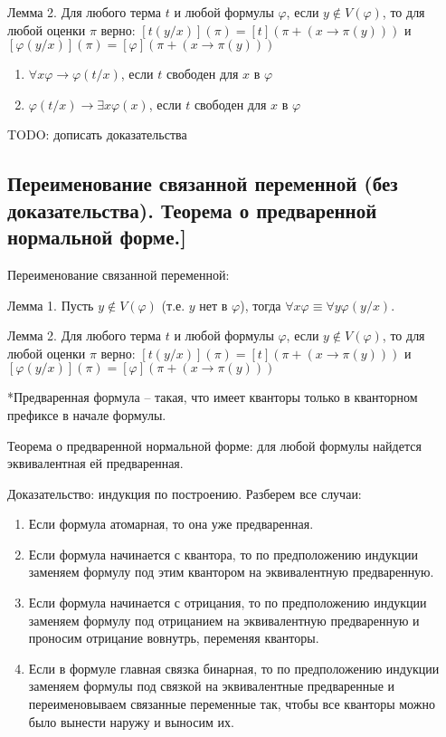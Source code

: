 \documentclass[a4paper, 10pt]{article}
\begin{document}
Лемма 2. Для любого терма $t$ и любой формулы $\varphi$, если $y \not\in V(\varphi)$, то для любой оценки $\pi$ верно: $[t(y/x)](\pi)=[t](\pi + (x \to \pi(y)))$ и $[\varphi(y/x)](\pi)=[\varphi](\pi + (x \to \pi(y)))$

\hfill

\begin{enumerate}
    \item $\forall x\varphi \to \varphi(t/x)$, если $t$ свободен для $x$ в $\varphi$
    \item $\varphi(t/x) \to \exists x \varphi(x)$, если $t$ свободен для $x$ в $\varphi$
\end{enumerate}

\hfill

TODO: дописать доказательства

\subsection{Переименование связанной переменной (без доказательства). Теорема о предваренной нормальной форме.]}

Переименование связанной переменной:

Лемма 1. Пусть $y\not\in V(\varphi)$ (т.е. $y$ нет в $\varphi$), тогда $\forall x\varphi \equiv \forall y\varphi(y/x)$.

Лемма 2. Для любого терма $t$ и любой формулы $\varphi$, если $y \not\in V(\varphi)$, то для любой оценки $\pi$ верно: $[t(y/x)](\pi)=[t](\pi + (x \to \pi(y)))$ и $[\varphi(y/x)](\pi)=[\varphi](\pi + (x \to \pi(y)))$

\hfill

*Предваренная формула -- такая, что имеет кванторы только в кванторном префиксе в начале формулы.

Теорема о предваренной нормальной форме: для любой формулы найдется эквивалентная ей предваренная.

Доказательство: индукция по построению. Разберем все случаи:

\begin{enumerate}
    \item Если формула атомарная, то она уже предваренная.
    \item Если формула начинается с квантора, то по предположению индукции заменяем формулу под этим квантором на эквивалентную предваренную.
    \item Если формула начинается с отрицания, то по предположению индукции заменяем формулу под отрицанием на эквивалентную предваренную и проносим отрицание вовнутрь, переменяя кванторы.
    \item Если в формуле главная связка бинарная, то по предположению индукции заменяем формулы под связкой на эквивалентные предваренные и переименовываем связанные переменные так, чтобы все кванторы можно было вынести наружу и выносим их.
\end{enumerate}
\end{document}
